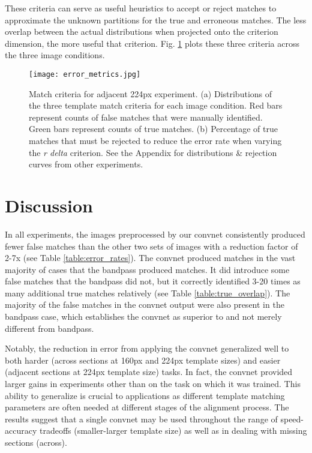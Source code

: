 \documentclass{article}
\begin{document}
These criteria can serve as useful heuristics to accept or reject matches to approximate the unknown partitions for the true and erroneous matches. The less overlap between the actual distributions when projected onto the criterion dimension, the more useful that criterion. Fig. \ref{criteria_distributions} plots these three criteria across the three image conditions.

\begin{figure}[h]
  \centering
  
  \texttt{[image: error\_metrics.jpg]}
  \caption{Match criteria for adjacent 224px experiment. (a) Distributions of the three template match criteria for each image condition. Red bars represent counts of false matches that were manually identified. Green bars represent counts of true matches. (b) Percentage of true matches that must be rejected to reduce the error rate when varying the \textit{r delta} criterion. See the Appendix for distributions \& rejection curves from other experiments.}
  \label{criteria_distributions}
\end{figure}


\section{Discussion}


In all experiments, the images preprocessed by our convnet consistently produced fewer false matches than the other two sets of images with a reduction factor of 2-7x (see Table \ref{table:error_rates}). The convnet produced matches in the vast majority of cases that the bandpass produced matches. It did introduce some false matches that the bandpass did not, but it correctly identified 3-20 times as many additional true matches relatively (see Table \ref{table:true_overlap}). The majority of the false matches in the convnet output were also present in the bandpass case, which establishes the convnet as superior to and not merely different from bandpass.

Notably, the reduction in error from applying the convnet generalized well to both harder (across sections at 160px and 224px template sizes) and easier (adjacent sections at 224px template size) tasks. In fact, the convnet provided larger gains in experiments other than on the task on which it was trained. This ability to generalize is crucial to applications as different template matching parameters are often needed at different stages of the alignment process. The results suggest that a single convnet may be used throughout the range of speed-accuracy tradeoffs (smaller-larger template size) as well as in dealing with missing sections (across).
\end{document}
